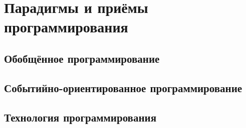 \chapter{Парадигмы и приёмы программирования}

\section{Обобщённое программирование}

\section{Событийно-ориентированное программирование}

\section{Технология программирования}
